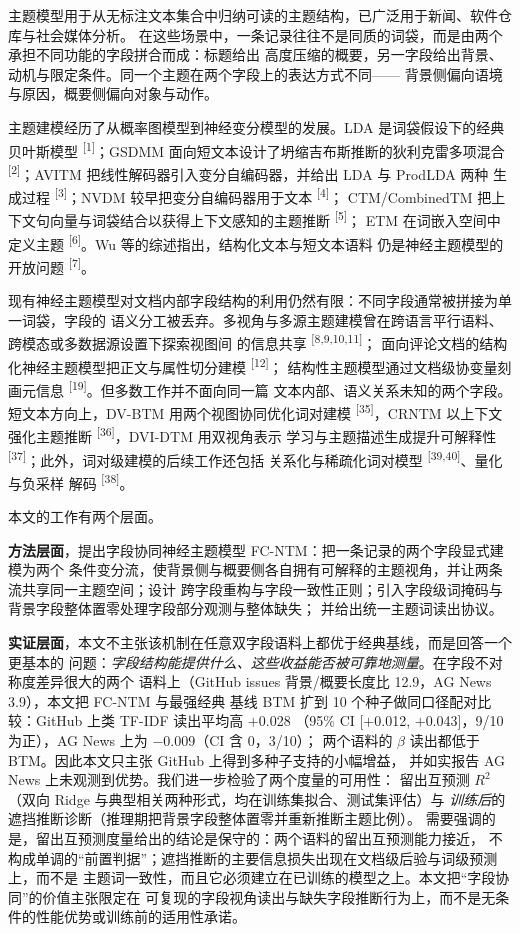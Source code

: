 \documentclass{article}
\begin{document}
主题模型用于从无标注文本集合中归纳可读的主题结构，已广泛用于新闻、软件仓库与社会媒体分析。
在这些场景中，一条记录往往不是同质的词袋，而是由两个承担不同功能的字段拼合而成：标题给出
高度压缩的概要，另一字段给出背景、动机与限定条件。同一个主题在两个字段上的表达方式不同——
背景侧偏向语境与原因，概要侧偏向对象与动作。

主题建模经历了从概率图模型到神经变分模型的发展。LDA 是词袋假设下的经典贝叶斯模型
\textsuperscript{[1]}；GSDMM 面向短文本设计了坍缩吉布斯推断的狄利克雷多项混合
\textsuperscript{[2]}；AVITM 把线性解码器引入变分自编码器，并给出 LDA 与 ProdLDA 两种
生成过程
\textsuperscript{[3]}；NVDM 较早把变分自编码器用于文本 \textsuperscript{[4]}；
CTM/CombinedTM 把上下文句向量与词袋结合以获得上下文感知的主题推断 \textsuperscript{[5]}；
ETM 在词嵌入空间中定义主题 \textsuperscript{[6]}。Wu 等的综述指出，结构化文本与短文本语料
仍是神经主题模型的开放问题 \textsuperscript{[7]}。

现有神经主题模型对文档内部字段结构的利用仍然有限：不同字段通常被拼接为单一词袋，字段的
语义分工被丢弃。多视角与多源主题建模曾在跨语言平行语料、跨模态或多数据源设置下探索视图间
的信息共享 \textsuperscript{[8,9,10,11]}；
面向评论文档的结构化神经主题模型把正文与属性切分建模 \textsuperscript{[12]}；
结构性主题模型通过文档级协变量刻画元信息 \textsuperscript{[19]}。但多数工作并不面向同一篇
文本内部、语义关系未知的两个字段。短文本方向上，DV-BTM 用两个视图协同优化词对建模
\textsuperscript{[35]}，CRNTM 以上下文强化主题推断 \textsuperscript{[36]}，DVI-DTM 用双视角表示
学习与主题描述生成提升可解释性 \textsuperscript{[37]}；此外，词对级建模的后续工作还包括
关系化与稀疏化词对模型 \textsuperscript{[39,40]}、量化与负采样
解码 \textsuperscript{[38]}。

本文的工作有两个层面。

\textbf{方法层面}，提出字段协同神经主题模型 FC-NTM：把一条记录的两个字段显式建模为两个
条件变分流，使背景侧与概要侧各自拥有可解释的主题视角，并让两条流共享同一主题空间；设计
跨字段重构与字段一致性正则；引入字段级词掩码与背景字段整体置零处理字段部分观测与整体缺失；
并给出统一主题词读出协议。

\textbf{实证层面}，本文不主张该机制在任意双字段语料上都优于经典基线，而是回答一个更基本的
问题：\emph{字段结构能提供什么、这些收益能否被可靠地测量}。在字段不对称度差异很大的两个
语料上（GitHub issues 背景/概要长度比 12.9，AG News 3.9），本文把 FC-NTM 与最强经典
基线 BTM 扩到 10 个种子做同口径配对比较：GitHub 上类 TF-IDF 读出平均高 $+$0.028
（95\% CI [$+$0.012, $+$0.043]，9/10 为正），AG News 上为 $-$0.009（CI 含 0，3/10）；
两个语料的 $\beta$ 读出都低于 BTM。因此本文只主张 GitHub 上得到多种子支持的小幅增益，
并如实报告 AG News 上未观测到优势。我们进一步检验了两个度量的可用性：
留出互预测 $R^2$（双向 Ridge 与典型相关两种形式，均在训练集拟合、测试集评估）与
\emph{训练后}的遮挡推断诊断（推理期把背景字段整体置零并重新推断主题比例）。
需要强调的是，留出互预测度量给出的结论是保守的：两个语料的留出互预测能力接近，
不构成单调的“前置判据”；遮挡推断的主要信息损失出现在文档级后验与词级预测上，而不是
主题词一致性，而且它必须建立在已训练的模型之上。本文把“字段协同”的价值主张限定在
可复现的字段视角读出与缺失字段推断行为上，而不是无条件的性能优势或训练前的适用性承诺。
\end{document}
